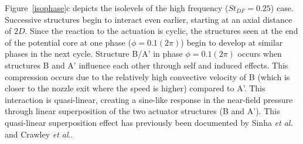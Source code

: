 \documentclass[english]{aiaa-tc}
\begin{document}
Figure~\ref{isophase}c depicts the isolevels of the high frequency
($St_{DF}=0.25$) case.  Successive structures begin to interact even
earlier, starting at an axial distance of $2D$.  Since the reaction
to the actuation is cyclic, the structures seen at the end of the
potential core at one phase ($\phi=0.1(2\pi)$) begin to develop at
similar phases in the next cycle. Structure B/A' in phase
$\phi=0.1(2\pi)$ occurs when structures B and A' influence each other
through self and induced effects. This compression occurs due to the
relatively high convective velocity of B (which is closer to the
nozzle exit where the speed is higher) compared to A'. This
interaction is quasi-linear, creating a sine-like response in the
near-field pressure through linear superposition of the two
actuator structures (B and A'). This quasi-linear superposition effect
has previously been documented by Sinha {\em et al.}\cite{sinha2013}
and Crawley {\em et 
  al.}\cite{Crawley2014}.
\end{document}
